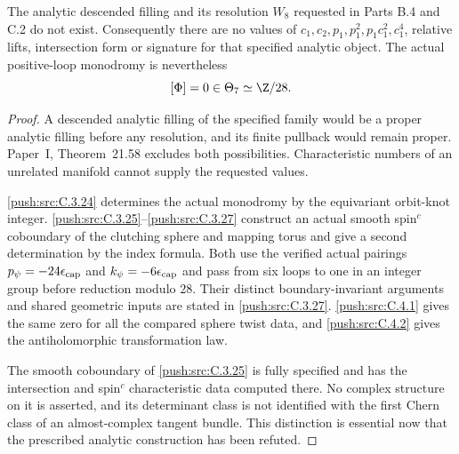 \begin{corollary}\label{push:src:C.5.1}
The analytic descended filling and its resolution $W_8$
requested in Parts B.4 and C.2 do not exist. Consequently
there are no values of $c_1,c_2,p_1,p_1^2,p_1c_1^2,c_1^4$,
relative lifts, intersection form or signature for that
specified analytic object. The actual positive-loop
monodromy is nevertheless
\[
                    [\Phi]=0\in\Theta_7\simeq\Z/28.
\]
\end{corollary}
\begin{proof}
A descended analytic filling of the specified family
would be a proper analytic filling before any resolution,
and its finite pullback would remain proper. Paper~I, Theorem~21.58
excludes both possibilities. Characteristic numbers of
an unrelated manifold cannot supply the requested values.

\ref{push:src:C.3.24} determines the actual monodromy by the equivariant
orbit-knot integer. \ref{push:src:C.3.25}--\ref{push:src:C.3.27} construct an actual
smooth spin$^c$ coboundary of the clutching sphere and
mapping torus and give a second determination by the
index formula. Both use the verified actual pairings
$p_\psi=-24\epsilon_{\rm cap}$ and
$k_\psi=-6\epsilon_{\rm cap}$ and pass from six loops
to one in an integer group before reduction modulo $28$.
Their distinct boundary-invariant arguments and shared
geometric inputs are stated in \ref{push:src:C.3.27}. \ref{push:src:C.4.1} gives the
same zero for all the compared sphere twist data, and
\ref{push:src:C.4.2} gives the antiholomorphic transformation law.

The smooth coboundary of \ref{push:src:C.3.25} is fully specified and
has the intersection and spin$^c$ characteristic data
computed there. No complex structure on it is asserted,
and its determinant class is not identified with the first
Chern class of an almost-complex tangent bundle. This
distinction is essential now that the prescribed analytic
construction has been refuted.
\end{proof}
